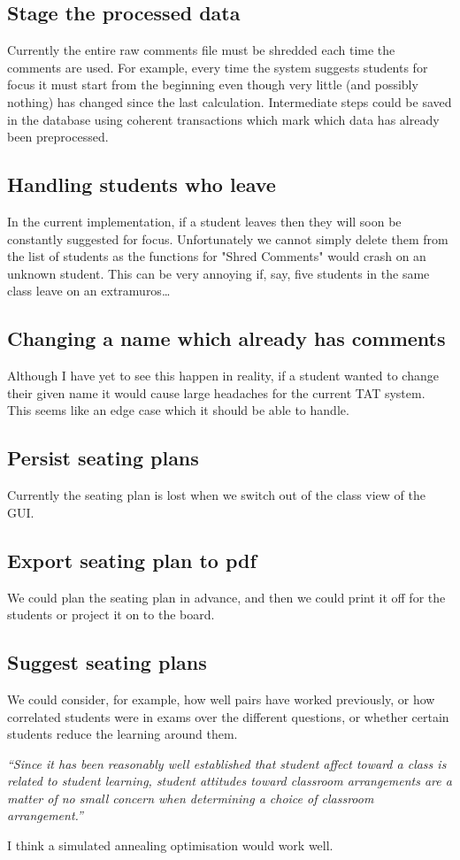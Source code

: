 \documentclass[10pt]{article}
\begin{document}
\subsection{Stage the processed data}
Currently the entire raw comments file must be shredded each time the comments are used. For example, every time the system suggests students for focus it must start from the beginning even though very little (and possibly nothing) has changed since the last calculation. Intermediate steps could be saved in the database using coherent transactions which mark which data has already been preprocessed.

\subsection{Handling students who leave}
In the current implementation, if a student leaves then they will soon be constantly suggested for focus. Unfortunately we cannot simply delete them from the list of students as the functions for "Shred Comments" would crash on an unknown student. This can be very annoying if, say, five students in the same class leave on an extramuros\ldots

\subsection{Changing a name which already has comments}
Although I have yet to see this happen in reality, if a student wanted to change their given name it would cause large headaches for the current TAT system. This seems like an edge case which it should be able to handle.

\subsection{Persist seating plans}
Currently the seating plan is lost when we switch out of the class view of the GUI.

\subsection{Export seating plan to pdf}
We could plan the seating plan in advance, and then we could print it off for the students or project it on to the board.

\subsection{Suggest seating plans}
We could consider, for example, how well pairs have worked previously, or how correlated students were in exams over the different questions, or whether certain students reduce the learning around them.
\begin{center} 
\emph{``Since it has been reasonably well established that student affect toward a class is related to student learning, student attitudes toward classroom arrangements are a matter of no small concern when determining a choice of classroom arrangement.''} \cite{MM78}
\end{center}
I think a simulated annealing optimisation would work well.
\end{document}
